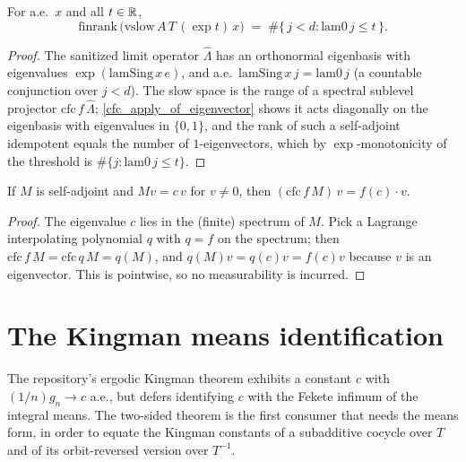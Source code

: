 \begin{proposition}\label{ae_finrank_vslow}
  \leanok
  For a.e.\ \(x\) and all \(t \in \mathbb{R}\),
  \[
    \mathrm{finrank}\,\bigl(\mathrm{vslow}\,A\,T\,(\exp t)\,x\bigr) \;=\; \#\{\, j < d : \mathrm{lam0}\,j \le t \,\}.
  \]
\end{proposition}
\begin{proof}\leanok
  The sanitized limit operator \(\widehat\Lambda\) has an orthonormal eigenbasis with eigenvalues \(\exp(\mathrm{lamSing}\,x\,e)\), and a.e.\ \(\mathrm{lamSing}\,x\,j = \mathrm{lam0}\,j\) (a countable conjunction over \(j < d\)). The slow space is the range of a spectral sublevel projector \(\mathrm{cfc}\,f\,\widehat\Lambda\); \cref{cfc_apply_of_eigenvector} shows it acts diagonally on the eigenbasis with eigenvalues in \(\{0,1\}\), and the rank of such a self-adjoint idempotent equals the number of \(1\)-eigenvectors, which by \(\exp\)-monotonicity of the threshold is \(\#\{j : \mathrm{lam0}\,j \le t\}\).
\end{proof}

\begin{lemma}\label{cfc_apply_of_eigenvector}
  \leanok
  If \(M\) is self-adjoint and \(M v = c\,v\) for \(v \neq 0\), then \((\mathrm{cfc}\,f\,M)\,v = f(c)\cdot v\).
\end{lemma}
\begin{proof}\leanok
  The eigenvalue \(c\) lies in the (finite) spectrum of \(M\). Pick a Lagrange interpolating polynomial \(q\) with \(q = f\) on the spectrum; then \(\mathrm{cfc}\,f\,M = \mathrm{cfc}\,q\,M = q(M)\), and \(q(M)v = q(c)v = f(c)v\) because \(v\) is an eigenvector. This is pointwise, so no measurability is incurred.
\end{proof}

\section{The Kingman means identification}

The repository's ergodic Kingman theorem exhibits a constant \(c\) with \((1/n)g_n \to c\) a.e., but defers identifying \(c\) with the Fekete infimum of the integral means. The two-sided theorem is the first consumer that needs the means form, in order to equate the Kingman constants of a subadditive cocycle over \(T\) and of its orbit-reversed version over \(T^{-1}\).

